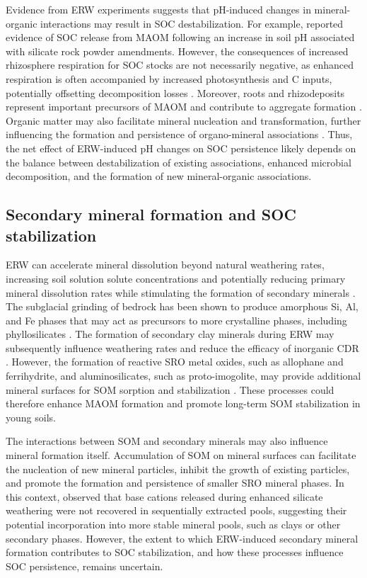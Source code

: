 \documentclass[preprint,12pt]{elsarticle}
\begin{document}
Evidence from ERW experiments suggests that pH-induced changes in mineral-organic interactions may result in SOC destabilization. For example, \citep{steinwidder2025beyond} reported evidence of SOC release from MAOM following an increase in soil pH associated with silicate rock powder amendments. However, the consequences of increased rhizosphere respiration for SOC stocks are not necessarily negative, as enhanced respiration is often accompanied by increased photosynthesis and C inputs, potentially offsetting decomposition losses \citep{Kuzyakov2001}. Moreover, roots and rhizodeposits represent important precursors of MAOM and contribute to aggregate formation \citep{Leuthold2026, Sokol2022}. Organic matter may also facilitate mineral nucleation and transformation, further influencing the formation and persistence of organo-mineral associations \citep{kleber2021dynamic}. Thus, the net effect of ERW-induced pH changes on SOC persistence likely depends on the balance between destabilization of existing associations, enhanced microbial decomposition, and the formation of new mineral-organic associations.

\subsection{Secondary mineral formation and SOC stabilization}

ERW can accelerate mineral dissolution beyond natural weathering rates, increasing soil solution solute concentrations and potentially reducing primary mineral dissolution rates while stimulating the formation of secondary minerals \citep{Andrews2019,steinwidder2025beyond}. The subglacial grinding of bedrock has been shown to produce amorphous Si, Al, and Fe phases that may act as precursors to more crystalline phases, including phyllosilicates \citep{Behrens2015}. The formation of secondary clay minerals during ERW may subsequently influence weathering rates and reduce the efficacy of inorganic CDR \citep{manning2024soil}. However, the formation of reactive SRO metal oxides, such as allophane and ferrihydrite, and aluminosilicates, such as proto-imogolite, may provide additional mineral surfaces for SOM sorption and stabilization \citep{sokol2024reduced,steinwidder2025beyond}. These processes could therefore enhance MAOM formation and promote long-term SOM stabilization in young soils.

The interactions between SOM and secondary minerals may also influence mineral formation itself. Accumulation of SOM on mineral surfaces can facilitate the nucleation of new mineral particles, inhibit the growth of existing particles, and promote the formation and persistence of smaller SRO mineral phases. In this context, \citep{steinwidder2025beyond} observed that base cations released during enhanced silicate weathering were not recovered in sequentially extracted pools, suggesting their potential incorporation into more stable mineral pools, such as clays or other secondary phases. However, the extent to which ERW-induced secondary mineral formation contributes to SOC stabilization, and how these processes influence SOC persistence, remains uncertain.
\end{document}

